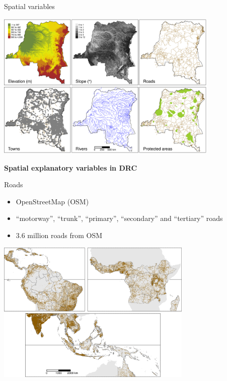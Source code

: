 \documentclass[10pt,table,dvipsnames,compress]{beamer}
\begin{document}
\begin{frame}[label={sec:orgbd91830}]{Spatial variables}
\begin{center}
\includegraphics[width=0.8\textwidth]{figs/sm/var.png}
\end{center}

\centering \textbf{Spatial explanatory variables in DRC}
\end{frame}

\begin{frame}[label={sec:orgd6e5a80}]{Roads}
\begin{itemize}
\item OpenStreetMap (OSM)
\item ``motorway'', ``trunk'', ``primary'', ``secondary'' and ``tertiary'' roads
\item 3.6 million roads from OSM
\end{itemize}

\begin{center}
\includegraphics[width=0.7\textwidth]{figs/sm/roads.png}
\end{center}
\end{frame}
\end{document}
